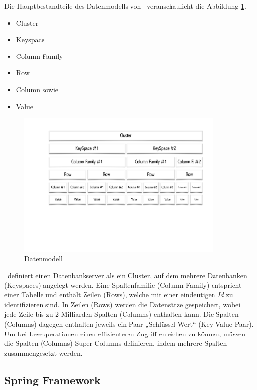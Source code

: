 Die Hauptbestandteile des Datenmodells von \cass\ veranschaulicht die Abbildung \ref{img:cassandraDataModel}.
\begin{itemize}
\item Cluster
\item Keyspace
\item Column Family
\item Row
\item Column sowie
\item Value
\end{itemize}
\begin{figure}[H]
\centering
 \includegraphics[trim = 25mm 70mm 15mm 15mm, clip, width=0.9\textwidth]{resources/cassandra/cassandraDataModel}
\caption[Datenmodell]{Datenmodell}
\label{img:cassandraDataModel}
\end{figure}
\cass\ definiert einen Datenbankserver als ein Cluster, auf dem mehrere Datenbanken (Keyspaces) angelegt werden. Eine Spaltenfamilie (Column Family) entspricht einer Tabelle und enthält Zeilen (Rows), welche mit einer eindeutigen \textit{Id} zu identifizieren sind. In Zeilen (Rows) werden die Datensätze gespeichert, wobei jede Zeile bis zu 2 Milliarden Spalten (Columns) enthalten kann. Die Spalten (Columns) dagegen enthalten jeweils ein Paar „Schlüssel-Wert“ (Key-Value-Paar). 
Um bei Leseoperationen einen effizienteren Zugriff erreichen zu können, müssen die Spalten (Columns) Super Columns definieren, indem mehrere Spalten zusammengesetzt werden.

\subsection{Spring Framework}


